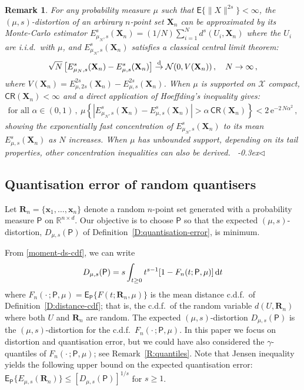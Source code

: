 \documentclass{article}
\def\Px{\mathsf{P}}
\def\RR{\mathds{R}}
\def\SX{{\mathscr X}}
\def\xb{\mathbf{x}}
\def\Xb{\mathbf{X}}
\def\Ex{\mathsf{E}}
\newcommand{\bea}{\begin{eqnarray*}}
\newcommand{\eea}{\end{eqnarray*}}
\newcommand{\be}{\begin{eqnarray}}
\newcommand{\ee}{\end{eqnarray}}
\def\Rb{\mathbf{R}}
\def\CR{\mathsf{CR}}
\def\mg{\gamma}
\def\dd{\mbox{\rm d}}
\def\rad{\stackrel{\rm d}{\ra}}
\def\ra{\rightarrow}
\def\SN{{\mathcal N}}
\def\ma{\alpha}
\def\e1{\mathrm{e}}
\newcommand{\fin} {\mbox{}~\hfill{\lower-0.3ex\hbox{$\triangleleft$}}}
\newtheorem{remark}{Remark}[section]
\begin{document}

\begin{remark}\label{R:distortion-evaluation}
For any probability measure $\mu$ such that $\Ex\{\|X\|^{2s}\}<\infty$, the $(\mu,s)$-distortion of an arbirary $n$-point set $\Xb_n$ can be approximated by its Monte-Carlo estimator $E_{\mu_N,s}^s(\Xb_n)=(1/N)\sum_{i=1}^N d^s(U_i,\Xb_n)$ where the $U_i$ are i.i.d.\ with $\mu$, and $E_{\mu_N,s}^s(\Xb_n)$ satisfies a classical central limit theorem:
\bea
\sqrt{N} \left[E_{\mu_N,s}^s(\Xb_n)-E_{\mu,s}^s(\Xb_n)\right] \rad \SN(0,V(\Xb_n))\,, \quad N\to\infty\,,
\eea
where $V(\Xb_n)=E_{\mu,2s}^{2s}(\Xb_n)-E_{\mu,s}^{2s}(\Xb_n)$. When $\mu$ is supported on $\SX$ compact, $\CR(\Xb_n)<\infty$ and a direct application of Hoeffding's inequality gives:
\bea
\mbox{for all } \ma\in(0,1)\,, \ \mu\left\{|E_{\mu_N,s}^s(\Xb_n)-E_{\mu,s}^s(\Xb_n)|>\ma\, \CR(\Xb_n) \right\} < 2\,\e1^{-2\,N\ma^2} \,,
\eea
showing the exponentially fast concentration of $E_{\mu_N,s}^s(\Xb_n)$ to its mean $E_{\mu,s}^s(\Xb_n)$ as $N$ increases. When $\mu$ has unbounded support, depending on its tail properties, other concentration inequalities can also be derived.
\fin
\end{remark}


\subsection{Quantisation error of random quantisers}

Let $\Rb_n=\{\xb_1,\ldots,\xb_n\}$ denote a random $n$-point set generated with a probability measure $\Px$ on $\RR^{n\times d}$. Our objective is to choose $\Px$ so that the expected $(\mu,s)$-distortion, $D_{\mu,s}(\Px)$ of Definition~\ref{D:quantisation-error}, is minimum.

From \eqref{moment-ds-cdf}, we can write
\be\label{Ls-mean-meandcdf}
D_{\mu,s}(\Px) =  s \int_{t\geq 0} t^{s-1}[1-F_n(t;\Px,\mu)]\,\dd t
\ee
where $F_n(\cdot\,; \Px,\mu) = \Ex_\Px\{F(t;\Rb_n,\mu) \}$ is the mean distance c.d.f.\ of Definition~\ref{D:distance-cdf}; that is, the c.d.f.\ of the random variable $d(U,\Rb_n)$ where both $U$ and $\Rb_n$ are random. The expected $(\mu,s)$-distortion $D_{\mu,s}(\Px)$ is the $(\mu,s)$-distortion for the c.d.f.\ $F_n(\cdot\,; \Px,\mu)$. In this paper we focus on distortion and quantisation error, but we could have also considered the $\mg$-quantiles of $F_n(\cdot\,; \Px,\mu)$; see Remark~\ref{R:quantiles}.
Note that Jensen inequality yields the following upper bound on the expected quantisation error: $\Ex_\Px\{ E_{\mu,s}(\Rb_n) \}\leq [D_{\mu,s}(\Px)]^{1/s}$ for $s \geq 1$.
\end{document}
